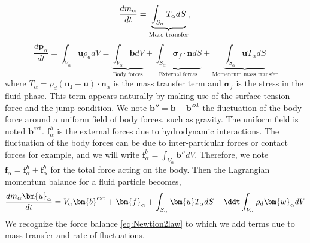 \begin{equation}
    \label{eq:masscons}
    \frac{d m_\alpha}{dt} 
    = \underbrace{\int_{S_\alpha} T_\alpha dS}_{\text{Mass transfer}},\\
\end{equation}    
\begin{equation}
    \frac{d\bm{p}_\alpha}{dt} 
    = \int_{V_\alpha} \bm{u} \rho_d dV 
    = \underbrace{\int_{V_\alpha} \bm{b} dV}_{\text{Body forces}} 
    + \underbrace{\int_{S_\alpha} \bm{\sigma}_f \cdot \bm{n} dS}_{\text{External forces}}
    + \underbrace{\int_{S_\alpha} \bm{u} T_\alpha dS}_{\text{Momentum mass transfer}}
\end{equation}
where $T_\alpha = \rho_d\left(\bm{u_I}-\bm{u}\right)\cdot\bm{n}_\alpha$ is the mass transfer term and $\bm{\sigma}_f$ is the stress in the fluid phase.
This term appears naturally by making use of the surface tension force and the jump condition.
We note $\bm{b''} = \bm{b} - \bm{b}^{\text{ext}}$ the fluctuation of the body force around a uniform field of body forces, such as gravity. 
The uniform field is noted $\bm{b}^{\text{ext}}$.
$\bm{f}^h_\alpha$ is the external forces due to hydrodynamic interactions.
The fluctuation of the body forces can be due to inter-particular forces or contact forces for example, and we will write  $\bm{f}^b_\alpha = \int_{V_\alpha} \bm{b''} dV$.
Therefore, we note $\bm{f}_\alpha = \bm{f}^h_\alpha + \bm{f}^b_\alpha$ for the total force acting on the body.
Then the Lagrangian momentum balance for a fluid particle becomes, 
\begin{equation}
    \frac{d m_\alpha \bm{u}_{\alpha}}{dt} 
    = V_\alpha\bm{b}^{\text{ext}} 
    + \bm{f}_\alpha
    + \int_{S_\alpha} \bm{u} T_\alpha dS
    - \ddt   \int_{V_\alpha} \rho_d \bm{w}_\alpha dV
\end{equation}
We recognize the force balance \ref{eq:Newtion2law} to which we add terms due to mass transfer and rate of fluctuations. 


